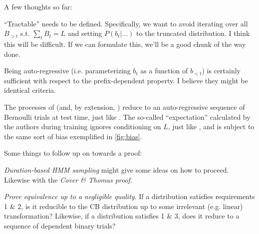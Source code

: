 \documentclass{article}
\begin{document}
A few thoughts so far:

``Tractable'' needs to be defined. Specifically, we want to avoid iterating
over all $B_{>t}$ s.t. $\sum_t B_t = L$ and setting $P(b_t|\ldots)$ to the
truncated distribution. I think this will be difficult. If we can formulate
this, we'll be a good chunk of the way done.

Being auto-regressive (i.e. parameterizing $b_t$ as a function of $b_{<t}$) is
certainly sufficient with respect to the prefix-dependent property. I believe
they might be identical criteria.

The processes of \citet{raffelOnlineLineartimeAttention2017} (and, by
extension, \citet{chiuMonotonicChunkwiseAttention2018}) reduce to an
auto-regressive sequence of Bernoulli trials at test time, just like
\citeauthor{luoLearningOnlineAlignments2017}. The so-called ``expectation''
calculated by the authors during training ignores conditioning on $L$, just
like \citeauthor{luoLearningOnlineAlignments2017}, and is subject to the same
sort of bias exemplified in \cref{fig:bias}.

Some things to follow up on towards a proof:

\emph{Duration-based HMM sampling} might give some ideas on how to proceed.
Likewise with the \emph{Cover \& Thomas proof}.

\emph{Prove equivalence up to a negligible quality}. If a distribution
satisfies requirements 1 \& 2, is it reducible to the CB distribution up to
some irrelevant (e.g. linear) transformation? Likewise, if a distribution
satisfies 1 \& 3, does it reduce to a sequence of dependent binary trials?
\end{document}
